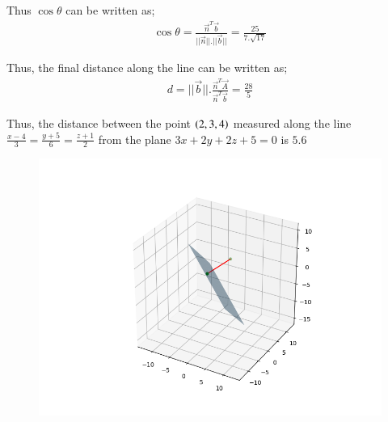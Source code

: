 \documentclass[journal]{IEEEtran}
\begin{document}
Thus $\cos\theta$ can be written as;
\begin{align}
\cos\theta = \frac{\Vec{n}^T\Vec{b}}{||\Vec{n}||.||\Vec{b}||}=\frac{25}{7.\sqrt{17}}
\end{align}

Thus, the final distance along the line can be written as;
\begin{align}
d=||\Vec{b}||.\frac{\Vec{n}^T\Vec{A}}{\Vec{n}^T\Vec{b}}=\frac{28}{5}
\end{align}

Thus, the distance between the point $\left(2,3,4\right)$ measured along the line $\frac{x-4}{3}=\frac{y+5}{6}=\frac{z+1}{2}$ from the plane $3x+2y+2z+5=0$ is $5.6$

\begin{figure}[H]
\centering
\includegraphics[width=0.8\columnwidth]{figs/img.png}
\caption*{}
\end{figure}
\end{document}
